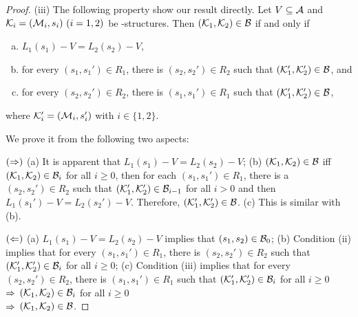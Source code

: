 \documentclass[letterpaper]{article} %
\begin{document}
\begin{proof}
(iii)
The following property show our result directly.
Let $V\subseteq\cal A$
and ${\cal K}_i=({\cal M}_i,s_i)~(i=1,2)$ be \MPK-structures.
Then $({\cal K}_1,{\cal K}_2)\in\cal B$ if and only if
  \begin{enumerate}[(a)]
    \item $L_1(s_1)- V = L_2(s_2)- V$,
    \item for every $(s_1,s_1')\in R_1$, there is $(s_2,s_2')\in R_2$
    such that $({\cal K}_1',{\cal K}_2')\in {\cal B}$, and
    \item for every $(s_2,s_2')\in R_2$, there is $(s_1,s_1')\in R_1$
    such that $({\cal K}_1',{\cal K}_2')\in {\cal B}$,
   \end{enumerate}
 where ${\cal K}_i'=({\cal M}_i,s_i')$ with $i\in\{1,2\}$.

 We prove it from the following two aspects:

 $(\Rightarrow)$
(a) It is apparent that $L_1(s_1)- V = L_2(s_2)- V$;
(b) %
$({\cal K}_1, {\cal K}_2) \in {\cal B}$ iff $({\cal K}_1, {\cal K}_2) \in {\cal B}_i$ for all $i \geq 0$, then for each $(s_1, s_1') \in R_1$, there is a $(s_2, s_2')\in R_2$  such that  $({\cal K}_1', {\cal K}_2') \in {\cal B}_{i-1}$ for all $i > 0$ and then $L_1(s_1')- V = L_2(s_2')- V$. Therefore, $({\cal K}_1', {\cal K}_2') \in {\cal B}$.
(c) %
 This is similar with (b).

$(\Leftarrow)$ (a) $L_1(s_1)- V = L_2(s_2)- V$ implies that $(s_1, s_2) \in {\cal B}_0$;
(b) Condition (ii) implies that for every $(s_1,s_1')\in R_1$, there is $(s_2,s_2')\in R_2$
    such that $({\cal K}_1',{\cal K}_2')\in {\cal B}_i$ for all $i \geq 0$;
(c) Condition (iii) implies that for every $(s_2,s_2')\in R_2$, there is $(s_1,s_1')\in R_1$
    such that $({\cal K}_1',{\cal K}_2')\in {\cal B}_i$ for all $i \geq 0$\\
$\Rightarrow$ $({\cal K}_1, {\cal K}_2) \in {\cal B}_i$ for all $i \geq 0$\\
$\Rightarrow$ $({\cal K}_1,{\cal K}_2)\in\cal B$.



\end{proof}
\end{document}
